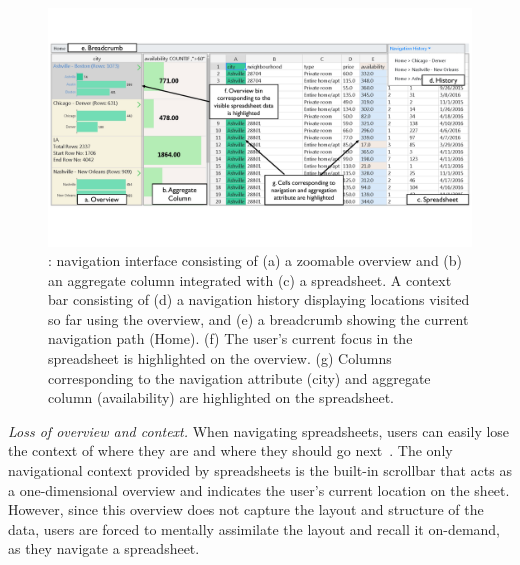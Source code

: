 \begin{figure}
     \centering %
  \includegraphics[width=\linewidth,trim={0 95 0 80},clip]{images/screenshot.pdf}
    \caption{\noah: navigation interface consisting of (a) a zoomable overview and (b) an aggregate column integrated with (c) a spreadsheet. A context bar consisting of (d) a navigation history displaying locations visited so far using the overview, and (e) a breadcrumb showing the current navigation path (\eg Home). (f) The user’s current focus in the spreadsheet is highlighted on the overview. (g) Columns corresponding to the navigation attribute (city) and aggregate column (availability) are highlighted on the spreadsheet.}
  \label{fig:ux}
\end{figure}

\squishlist
\item {\em Loss of overview and context.}
When navigating
spreadsheets, users can easily lose the context
of where they are and where they should go next~\cite{network-context}.
The only navigational context provided by spreadsheets
is the built-in scrollbar that acts as a one-dimensional
overview and indicates the user's current location on the sheet.
However, since this overview does not capture the
layout and structure of the data,
users are forced to mentally assimilate
the layout and recall it on-demand, as they navigate a spreadsheet.

